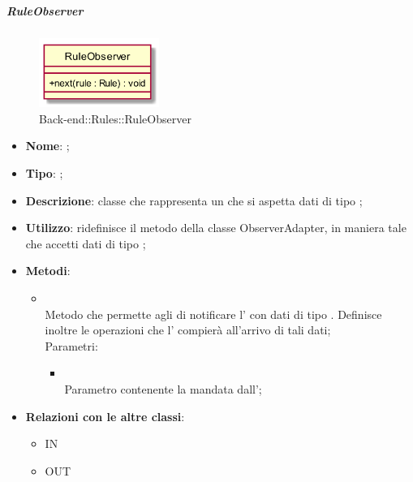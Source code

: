 \hypertarget{RuleObserver_label}{\subparagraph{RuleObserver}}
\begin{figure}[h]
	\centering
	\includegraphics[width=0.35\textwidth,height=\textheight,keepaspectratio]{images/ClassRuleObserver.png}
	\caption{Back-end::Rules::RuleObserver}
\end{figure}
\begin{itemize}
	\item \textbf{Nome}: ;
	\item \textbf{Tipo}: ;
	\item \textbf{Descrizione}: classe che rappresenta un  che si aspetta dati di tipo ;
	\item \textbf{Utilizzo}: ridefinisce il metodo  della classe ObserverAdapter, in maniera tale che accetti dati di tipo ;
	\item \textbf{Metodi}:
	\begin{itemize}
		\item[]  \\		Metodo che permette agli  di notificare l' con dati di tipo . Definisce inoltre le operazioni che l' compierà all'arrivo di tali dati;\\
		Parametri:
		\begin{itemize}
			\item {} \\
			Parametro contenente la  mandata dall';
		\end{itemize}
	\end{itemize}
	\item \textbf{Relazioni con le altre classi}:
	\begin{itemize}
		\item IN \hyperlink{RuleObservable_label}{}
		\item OUT \hyperlink{Rule_label}{}
	\end{itemize}
\end{itemize}
\FloatBarrier

